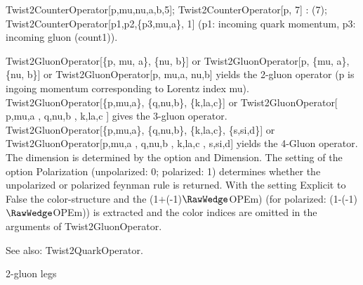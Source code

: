 Twist2CounterOperator[p,mu,nu,a,b,5]; Twist2CounterOperator[p, 7] : (7); { }Twist2CounterOperator[p1,p2,\{p3,mu,a\}, 1] (p1: incoming
  quark momentum, p3: incoming gluon (count1)).










Twist2GluonOperator[\{p, mu, a\}, \{nu, b\}] or Twist2GluonOperator[p, \{mu, a\}, \{nu, b\}] or Twist2GluonOperator[p, mu,a, nu,b] yields
  the 2-gluon operator (p is ingoing momentum corresponding to Lorentz index mu). Twist2GluonOperator[\{p,mu,a\}, \{q,nu,b\}, \{k,la,c\}]
  or Twist2GluonOperator[ p,mu,a , q,nu,b , k,la,c ] gives the 3-gluon operator. Twist2GluonOperator[\{p,mu,a\}, \{q,nu,b\}, \{k,la,c\},
  \{s,si,d\}] or Twist2GluonOperator[p,mu,a , q,nu,b , k,la,c , s,si,d] yields the 4-Gluon operator. The dimension is determined by the
  option and Dimension. The setting of the option Polarization (unpolarized: 0; polarized: 1) determines whether the unpolarized or
  polarized feynman rule is returned. With the setting Explicit to False the color-structure and the (1\(+\)(-1)\(\RawWedge\)OPEm) (for
  polarized: (1-(-1)\(\RawWedge\)OPEm)) is extracted and the color indices are omitted in the arguments of Twist2GluonOperator.

See also:  Twist2QuarkOperator.




2-gluon legs

